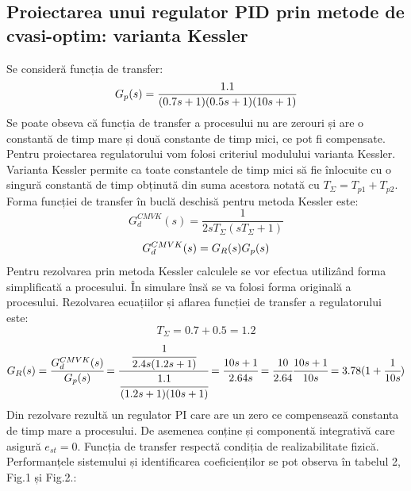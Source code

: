 \documentclass[11pt]{article}
\newcommand{\EqRow}{\vspace{1.5mm}}
\begin{document}
\subsection{Proiectarea unui regulator PID prin metode de cvasi-optim: varianta Kessler}
Se consideră funcția de transfer:
\EqRow
\begin{equation}
G_p(s)=\frac{1.1}{(0.7s+1)(0.5s+1)(10s+1)}
\EqRow
\end{equation}
Se poate obseva că funcția de transfer a procesului nu are zerouri și are o  constantă de timp mare și două constante de timp mici, ce pot fi compensate. Pentru proiectarea regulatorului vom folosi criteriul modulului varianta Kessler. Varianta Kessler permite ca toate constantele de timp mici să fie înlocuite cu o singură constantă de timp obținută din suma acestora notată cu $T_{\Sigma}=T_{p1}+T_{p2}$.
Forma funcției de transfer în buclă deschisă pentru metoda Kessler este:
\vfill
\begin{equation} 
G_d^{CMVK}(s)=\frac{1}{2sT_{\Sigma}(sT_{\Sigma}+1)}
\end{equation}
\EqRow
\begin{equation} 
G_d^{CMVK}(s)=G_R(s)G_p(s)
\EqRow
\end{equation}
Pentru rezolvarea prin metoda Kessler calculele se vor efectua utilizând forma simplificată a procesului. În simulare însă se va folosi forma originală a procesului. Rezolvarea ecuațiilor și aflarea funcției de transfer a regulatorului este:
\vfill
$$T_{\Sigma}=0.7+0.5=1.2$$
\vfill
$$G_R(s)=\cfrac{G_d^{CMVK}(s)}{G_p(s)}=\cfrac{\cfrac{1}{2.4s(1.2s+1)}}{\cfrac{1.1}{(1.2s+1)(10s+1)}}=\cfrac{10s+1}{2.64s}=\cfrac{10}{2.64}\cfrac{10s+1}{10s}=3.78(1+\cfrac{1}{10s})\EqRow$$
Din rezolvare rezultă un regulator PI care are un zero ce compensează constanta de timp mare a procesului. De asemenea conține și componentă integrativă care asigură $e_{st}=0$. Funcția de transfer respectă condiția de realizabilitate fizică. Performanțele sistemului și identificarea coeficienților se pot observa în tabelul 2, Fig.1 și Fig.2.:
\end{document}
